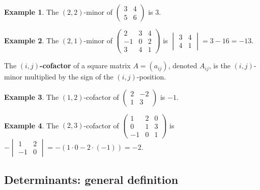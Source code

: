 \documentclass[
  english,
  12pt,
  oneside]{book}
\theoremstyle{definition}
\theoremstyle{definition}
\newtheorem{example}{Example}[chapter]
\theoremstyle{definition}
\theoremstyle{definition}
\theoremstyle{remark}
\begin{document}
\begin{example}
\protect\hypertarget{exm:unnamed-chunk-49}{}\label{exm:unnamed-chunk-49}The \((2,2)\)-minor of \(\begin{pmatrix}3&4\\5&6\end{pmatrix}\) is \(3\).
\end{example}

\begin{example}
\protect\hypertarget{exm:unnamed-chunk-50}{}\label{exm:unnamed-chunk-50}The \((2,1)\)-minor of \(\begin{pmatrix}2&3&4\\-1& 0 &2\\3&4&1\end{pmatrix}\) is \(\begin{vmatrix}3&4\\ 4&1\end{vmatrix}=3-16=-13\).
\end{example}

The \textbf{\((i,j)\)-cofactor} of a square matrix \(A=(a_{ij})\), denoted
\(A_{ij}\), is the \((i,j)\)-minor multiplied by the sign of the \((i,j)\)-position.

\begin{example}
\protect\hypertarget{exm:unnamed-chunk-51}{}\label{exm:unnamed-chunk-51}The \((1,2)\)-cofactor of \(\begin{pmatrix}2&-2\\1&3\end{pmatrix}\) is \(-1\).
\end{example}

\begin{example}
\protect\hypertarget{exm:unnamed-chunk-52}{}\label{exm:unnamed-chunk-52}The \((2,3)\)-cofactor of \(\begin{pmatrix}1&2&0\\0&1&3\\-1&0&1\end{pmatrix}\) is \(-\begin{vmatrix}1&2\\-1&0\end{vmatrix}=-(1\cdot0-2\cdot(-1))=-2\).
\end{example}

\subsection{Determinants: general definition}\label{determinants-general-definition}
\end{document}
